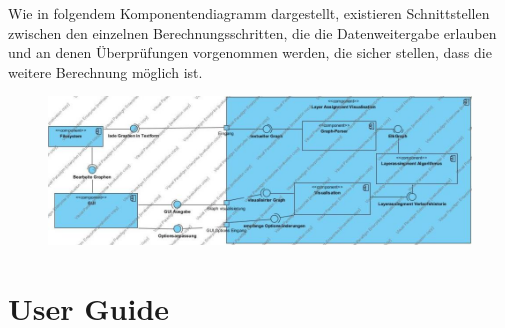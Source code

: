 \documentclass[12pt]{book}
\begin{document}
    Wie in folgendem Komponentendiagramm dargestellt, existieren Schnittstellen zwischen den einzelnen Berechnungsschritten, die die Datenweitergabe erlauben und an denen Überprüfungen vorgenommen werden, die sicher stellen, dass die weitere Berechnung möglich ist.
    
    
    \begin{figure}[ht!]
        \centering
        \includegraphics[width=\textwidth]{images/Component_Diagram1.jpg}
    \end{figure}
    
    
    
    
    \newpage
    
    
      
    
    
    
    
    
    
    \section*{User Guide}
    
    
    
    
    

    
    
    
    
    
    
\end{document}
